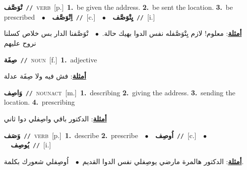 \documentclass[10pt,a4paper,twoside]{article} %
\begin{document}
\begin{multicols}{2}
{\setlength\topsep{0pt}\textbf{\foreignlanguage{arabic}{تْوَصَّف}}\ {\color{gray}\texttt{//}\color{black}}\ \textsc{verb}\ [p.]\ \textbf{1.}~be given the address.  \textbf{2.}~be sent the location.  \textbf{3.}~be prescribed\ \ $\bullet$\ \ \setlength\topsep{0pt}\textbf{\foreignlanguage{arabic}{اِتْوَصَّف}}\ {\color{gray}\texttt{//}\color{black}}\ [c.]\ \ $\bullet$\ \ \setlength\topsep{0pt}\textbf{\foreignlanguage{arabic}{يِتْوَصَّف}}\ {\color{gray}\texttt{//}\color{black}}\ [i.]\  \begin{flushright}\color{gray}\foreignlanguage{arabic}{\textbf{\underline{\foreignlanguage{arabic}{أمثلة}}}: معلوم! لازم يِتْوَصَّفله نفس الدوا بهيك حالة.\ $\bullet$\ \  تْوَصَّفنا الدار بس خلاص كسلنا نروح عليهم}\end{flushright}\color{black}} \vspace{2mm}

{\setlength\topsep{0pt}\textbf{\foreignlanguage{arabic}{صِفَة}}\ {\color{gray}\texttt{//}\color{black}}\ \textsc{noun}\ [f.]\ \textbf{1.}~adjective\  \begin{flushright}\color{gray}\foreignlanguage{arabic}{\textbf{\underline{\foreignlanguage{arabic}{أمثلة}}}: فش فيه ولا صِفَة عدلة}\end{flushright}\color{black}} \vspace{2mm}

{\setlength\topsep{0pt}\textbf{\foreignlanguage{arabic}{وَاصِف}}\ {\color{gray}\texttt{//}\color{black}}\ \textsc{noun\textunderscore act}\ [m.]\ \textbf{1.}~describing  \textbf{2.}~giving the address.  \textbf{3.}~sending the location.  \textbf{4.}~prescribing\  \begin{flushright}\color{gray}\foreignlanguage{arabic}{\textbf{\underline{\foreignlanguage{arabic}{أمثلة}}}: الدكتور باقي واصِفلي دوا ثاني}\end{flushright}\color{black}} \vspace{2mm}

{\setlength\topsep{0pt}\textbf{\foreignlanguage{arabic}{وَصَف}}\ {\color{gray}\texttt{//}\color{black}}\ \textsc{verb}\ [p.]\ \textbf{1.}~describe  \textbf{2.}~prescribe\ \ $\bullet$\ \ \setlength\topsep{0pt}\textbf{\foreignlanguage{arabic}{اُوصِف}}\ {\color{gray}\texttt{//}\color{black}}\ [c.]\ \ $\bullet$\ \ \setlength\topsep{0pt}\textbf{\foreignlanguage{arabic}{يُوصِف}}\ {\color{gray}\texttt{//}\color{black}}\ [i.]\  \begin{flushright}\color{gray}\foreignlanguage{arabic}{\textbf{\underline{\foreignlanguage{arabic}{أمثلة}}}: الدكتور هالمرة مارضي يوصِفلي نفس الدوا القديم\ $\bullet$\ \  اُوصِفلي شعورك بكلمة.}\end{flushright}\color{black}} \vspace{2mm}


\end{multicols}
\end{document}
